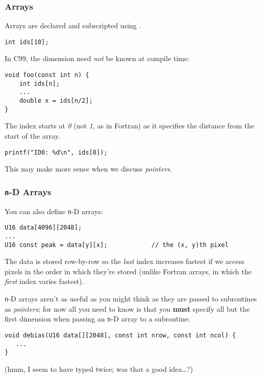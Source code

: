 \documentclass[10pt, t]{beamer}
\begin{document}
\begin{frame}[fragile]
\frametitle{Arrays}
\label{sec-3_1_7}

Arrays are declared and subscripted using \code{[]}.
\begin{verbatim}
int ids[10];
\end{verbatim}
\pause
In C99, the dimension need \emph{not} be known at compile time:
\begin{verbatim}
void foo(const int n) {
    int ids[n];
    ...
    double x = ids[n/2];
}
\end{verbatim}
The index starts at \emph{0} (not \emph{1}, as in Fortran) as it specifies the distance from the start of the array.
\begin{verbatim}
printf("ID0: %d\n", ids[0]);
\end{verbatim}
\pause
This may make more sense when we discuss \emph{pointers}.
\end{frame}
\begin{frame}[fragile]
\frametitle{\texttt{n}-D Arrays}
\label{sec-3_1_8}

You can also define \texttt{n}-D arrays:
\begin{verbatim}
U16 data[4096][2048];
...
U16 const peak = data[y][x];            // the (x, y)th pixel
\end{verbatim}

The data is stored row-by-row so the \emph{last} index increases fastest if we access pixels in the order in which
they're stored (unlike Fortran arrays, in which the \emph{first} index varies fastest).

\pause
\texttt{n}-D arrays aren't as useful as you might think as they are passed to
subroutines as \emph{pointers}; for now all you need to know is that you \textbf{must} specify
all but the first dimension when passing an \texttt{n}-D array to a subroutine:
\begin{verbatim}
void debias(U16 data[][2048], const int nrow, const int ncol) {
   ...
}
\end{verbatim}
\pause (hmm, I seem to have typed  twice; was that a good idea\ldots{}?)
\end{frame}
\end{document}
